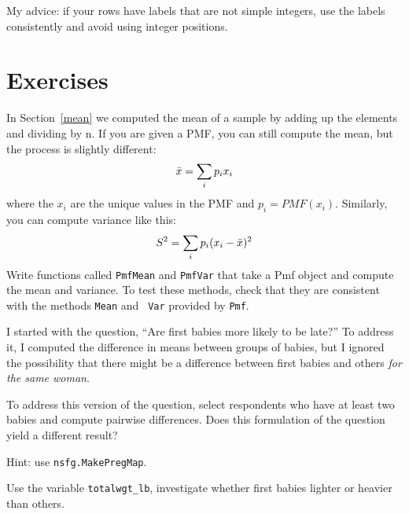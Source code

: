 \documentclass[12pt]{book}
\begin{document}
My advice: if your rows have labels that are not simple
integers, use the labels consistently and avoid
using integer positions.



\section{Exercises}

\begin{exercise}
%
%
In Section~\ref{mean} we computed the mean of a sample by adding up
the elements and dividing by n.  If you are given a PMF, you can
still compute the mean, but the process is slightly different:
%
\[ \bar{x} = \sum_i p_i x_i \]
%
where the $x_i$ are the unique values in the PMF and $p_i=PMF(x_i)$.
Similarly, you can compute variance like this:
%
\[ S^2 = \sum_i p_i (x_i - \bar{x})^2\]
% 
Write functions called {\tt PmfMean} and {\tt PmfVar} that take a
Pmf object and compute the mean and variance.  To test these methods,
check that they are consistent with the methods {\tt Mean} and {\tt
  Var} provided by {\tt Pmf}.
\end{exercise}


\begin{exercise}
I started with the question, ``Are first babies more likely
to be late?''  To address it, I computed the difference in
means between groups of babies, but I ignored the possibility
that there might be a difference between first babies and
others {\em for the same woman}.

To address this version of the question, select respondents who
have at least two babies and compute pairwise differences.  Does
this formulation of the question yield a different result?

Hint: use {\tt nsfg.MakePregMap}.
\end{exercise}


\begin{exercise}
Use the variable \verb"totalwgt_lb", investigate whether first
babies lighter or heavier than others.
\end{exercise}
\end{document}

